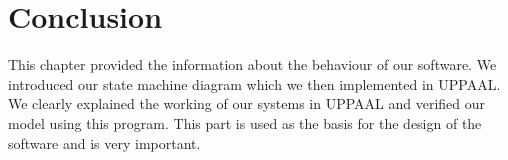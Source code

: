 \documentclass[a4paper,oneside,11pt]{article}
\begin{document}
\section{Conclusion}
This chapter provided the information about the behaviour of our software. We introduced our state machine diagram which we then implemented in UPPAAL. We clearly explained the working of our systems in UPPAAL and verified our model using this program. This part is used as the basis for the design of the software and is very important.
\end{document}
